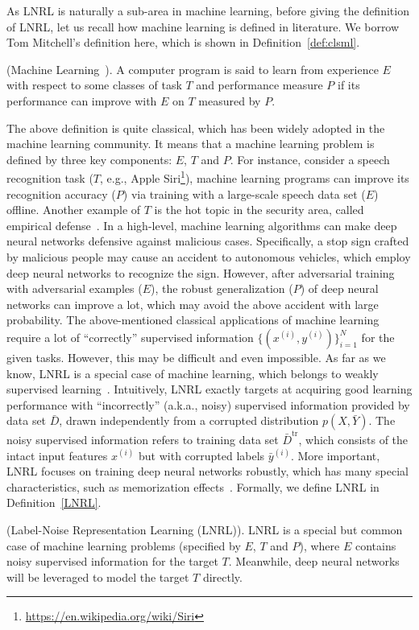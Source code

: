 \label{sec:pro-def}
As LNRL is naturally a sub-area in machine learning, 
before giving the definition of LNRL, let us recall how machine learning is defined in literature.
We borrow Tom Mitchell's definition here, 
which is shown in Definition~\ref{def:clsml}.
\begin{definition}
\label{def:clsml}
(Machine Learning~).
 A computer program is said to learn from experience $E$ with respect to some classes of task $T$ and performance measure $P$ if its performance can improve with $E$ on $T$ measured by $P$.
\end{definition}
The above definition is quite classical, which has been widely adopted in the machine learning community.
It means that a machine learning problem is defined by three key components: $E$, $T$ and $P$. 
For instance, consider a speech recognition task ($T$, e.g., 
Apple Siri\footnote{\url{https://en.wikipedia.org/wiki/Siri}}), 
machine learning programs can improve its recognition accuracy ($P$) via training with a large-scale speech data set ($E$) offline.
Another example  of $T$ is the hot topic in the security area, 
called empirical defense~. 
In a high-level, 
machine learning algorithms can make deep neural networks defensive against malicious cases. 
Specifically, a stop sign crafted by malicious people may cause an accident to autonomous vehicles, 
which employ deep neural networks to recognize the sign. 
However, 
after adversarial training with adversarial examples ($E$), 
the robust generalization ($P$) of deep neural networks can improve a lot, 
which may avoid the above accident with large probability. 
The above-mentioned classical applications of machine learning require a lot of ``correctly'' supervised information $\{(x^{(i)},y^{(i)})\}_{i=1}^N$ for the given tasks. 
However, this may be difficult and even impossible. 
As far as we know, LNRL is a special case of machine learning, which belongs to weakly supervised learning~. 
Intuitively, LNRL exactly targets at acquiring good learning performance with ``incorrectly'' (a.k.a., noisy) supervised information provided by data set $\bar{D}$, 
drawn independently from a corrupted distribution $p(X,\bar{Y})$.
The noisy supervised information refers to training data set $\bar{D}^{\text{tr}}$, which consists of the intact input features $x^{(i)}$ but with corrupted labels $\bar{y}^{(i)}$. More important, LNRL focuses on training deep neural networks robustly, which has many special characteristics, such as memorization effects~. Formally, we define LNRL in Definition~\ref{LNRL}.
\begin{definition}\label{LNRL}
(Label-Noise Representation Learning (LNRL)). 
LNRL is a special but common case of machine learning problems (specified by $E$, $T$ and $P$), 
where $E$ contains noisy supervised information for the target $T$. 
Meanwhile, deep neural networks will be leveraged to model the target $T$ directly. 
\end{definition}
